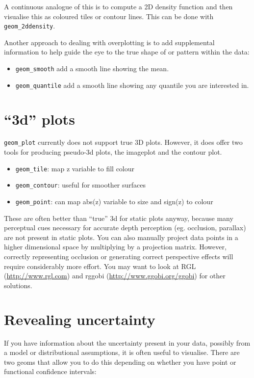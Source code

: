 A continuous analogue of this is to compute a 2D density function and then visualise this as coloured tiles or contour lines.  This can be done with {\tt geom\_2ddensity}.

Another approach to dealing with overplotting is to add supplemental information to help guide the eye to the true shape of or pattern within the data:

\begin{itemize}
	\item {\tt geom\_smooth} add a smooth line showing the mean.
	\item {\tt geom\_quantile} add a smooth line showing any quantile you are interested in.
\end{itemize}

\section{``3d'' plots}

{\tt geom\_plot} currently does not support true 3D plots.  However, it does offer two tools for producing pseudo-3d plots, the imageplot and the contour plot.

\begin{itemize}
	\item {\tt geom\_tile}: map z variable to fill colour
	\item {\tt geom\_contour}: useful for smoother surfaces
	\item {\tt geom\_point}: can map abs(z) variable to size and sign(z) to colour
\end{itemize}

These are often better than ``true'' 3d for static plots anyway, because many perceptual cues necessary for accurate depth perception (eg. occlusion, parallax) are not present in static plots.  You can also manually project data points in a higher dimensional space by multiplying by a projection matrix.  However, correctly representing occlusion or generating correct perspective effects will require considerably more effort.  You may want to look at RGL (\url{http://www.rgl.com}) and rggobi (\url{http://www.ggobi.org/ggobi}) for other solutions.

\section{Revealing uncertainty}\label{sub:displaying_uncertainty}

If you have information about the uncertainty present in your data, possibly from a model or distributional assumptions, it is often useful to visualise.  There are two geoms that allow you to do this depending on whether you have point or functional confidence intervals:

